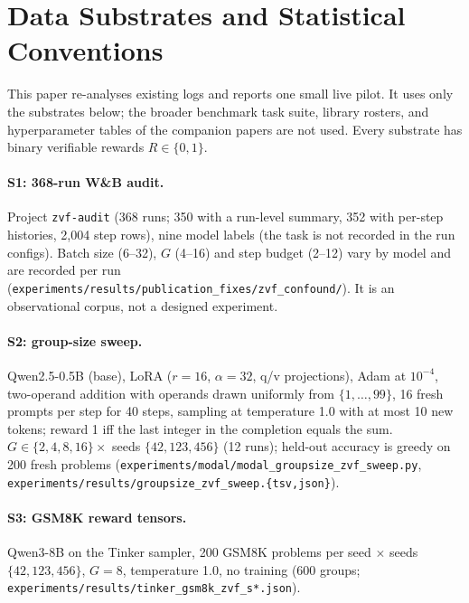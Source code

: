 \section{Data Substrates and Statistical Conventions}
\label{sec:p7-methods}
\label{sec:benchmark}
\label{sec:setup}
This paper re-analyses existing logs and reports one small live pilot. It
uses only the substrates below; the broader benchmark task suite, library
rosters, and hyperparameter tables of the companion papers are not used.
Every substrate has binary verifiable rewards $R\in\{0,1\}$.

\paragraph{S1: 368-run W\&B audit.} Project \texttt{zvf-audit} (368 runs; 350
with a run-level summary, 352 with per-step histories, 2{,}004 step rows),
nine model labels (the task is not recorded in the run configs). Batch size (6--32), $G$ (4--16) and step
budget (2--12) vary by model and are recorded per run
(\texttt{experiments/results/publication\_fixes/zvf\_confound/}). It is an
observational corpus, not a designed experiment.

\paragraph{S2: group-size sweep.} Qwen2.5-0.5B (base), LoRA ($r{=}16$,
$\alpha{=}32$, q/v projections), Adam at $10^{-4}$, two-operand addition with
operands drawn uniformly from $\{1,\dots,99\}$, 16 fresh prompts per step for
40 steps, sampling at temperature 1.0 with at most 10 new tokens; reward 1 iff
the last integer in the completion equals the sum. $G\in\{2,4,8,16\}\times$
seeds $\{42,123,456\}$ (12 runs); held-out accuracy is greedy on 200 fresh
problems (\texttt{experiments/modal/modal\_groupsize\_zvf\_sweep.py},
\texttt{experiments/results/groupsize\_zvf\_sweep.\{tsv,json\}}).

\paragraph{S3: GSM8K reward tensors.} Qwen3-8B on the Tinker sampler, 200
GSM8K problems per seed $\times$ seeds $\{42,123,456\}$, $G{=}8$, temperature
1.0, no training (600 groups;
\texttt{experiments/results/tinker\_gsm8k\_zvf\_s*.json}).

